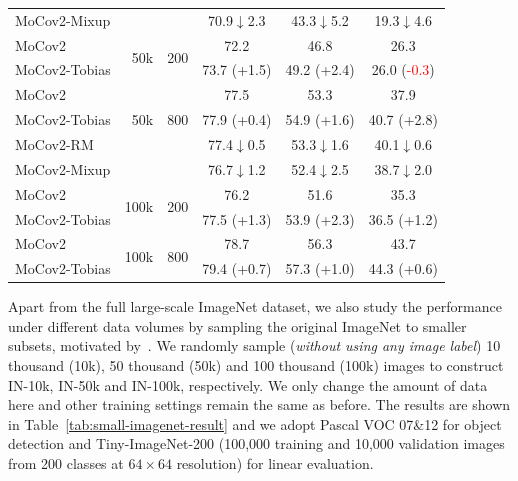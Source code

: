 \documentclass[letterpaper]{article} %
\def\pt{\phantom{0}}
\begin{document}
\begin{table}
\begin{tabular}{l|r|r|c|c|c}
		MoCov2-Mixup&&&70.9\pt$\downarrow$2.3\pt &43.3\pt$\downarrow$5.2\pt &19.3\pt$\downarrow$4.6\pt \\
		\cline{1-6}
		MoCov2&\multirow{2}{*}{50k} &   \multirow{2}{*}{200}  &          72.2 \pt\pt\pt\pt\pt  &      46.8 \pt\pt\pt\pt\pt              &    26.3 \pt\pt\pt\pt\pt \\
		MoCov2-Tobias& &    &     73.7 (\textcolor{grassgreen}{+1.5})  &  49.2 (\textcolor{grassgreen}{+2.4})     &  26.0 (\textcolor{red}{-0.3})\tiny\pt \\
		\cline{1-6}
		MoCov2&\multirow{3}{*}{50k} &   \multirow{3}{*}{800}  &          77.5 \pt\pt\pt\pt\pt  &    53.3  \pt\pt\pt\pt\pt              &    37.9 \pt\pt\pt\pt\pt \\
		MoCov2-Tobias& &    &     77.9 (\textcolor{grassgreen}{+0.4})   &        54.9 (\textcolor{grassgreen}{+1.6})     & 40.7 (\textcolor{grassgreen}{+2.8}) \\
		MoCov2-RM&&     &          77.4\pt$\downarrow$0.5\pt     &  53.3\pt$\downarrow$1.6\pt           & 40.1\pt$\downarrow$0.6\pt  \\
		MoCov2-Mixup&&&76.7\pt$\downarrow$1.2\pt &52.4\pt$\downarrow$2.5\pt &38.7\pt$\downarrow$2.0\pt \\
		\cline{1-6}
		MoCov2&\multirow{2}{*}{100k} &   \multirow{2}{*}{200}  &          76.2 \pt\pt\pt\pt\pt &    51.6  \pt\pt\pt\pt\pt                &  35.3 \pt\pt\pt\pt\pt  \\
		MoCov2-Tobias& &    &     77.5 (\textcolor{grassgreen}{+1.3})    &        53.9 (\textcolor{grassgreen}{+2.3})    &  36.5 (\textcolor{grassgreen}{+1.2}) \\
		\cline{1-6}
		MoCov2&\multirow{2}{*}{100k} &   \multirow{2}{*}{800}  &          78.7 \pt\pt\pt\pt\pt    &    56.3  \pt\pt\pt\pt\pt                &  43.7 \pt\pt\pt\pt\pt  \\
		MoCov2-Tobias& &    &     79.4 (\textcolor{grassgreen}{+0.7})    &        57.3 (\textcolor{grassgreen}{+1.0})    &  44.3 (\textcolor{grassgreen}{+0.6}) \\
		\hline
	\end{tabular}
\end{table}

Apart from the full large-scale ImageNet dataset, we also study the performance under different data volumes by sampling the original ImageNet to smaller subsets, motivated by~\citet{S3L:cao:arxiv2021}. We randomly sample (\textit{without using any image label}) 10 thousand (10k), 50 thousand (50k) and 100 thousand (100k) images to construct IN-10k, IN-50k and IN-100k, respectively. We only change the amount of data here and other training settings remain the same as before. The results are shown in Table~\ref{tab:small-imagenet-result} and we adopt Pascal VOC 07\&12 for object detection and Tiny-ImageNet-200 (100,000 training and 10,000 validation images from 200 classes at $64 \times 64$ resolution) for linear evaluation.
\end{document}
